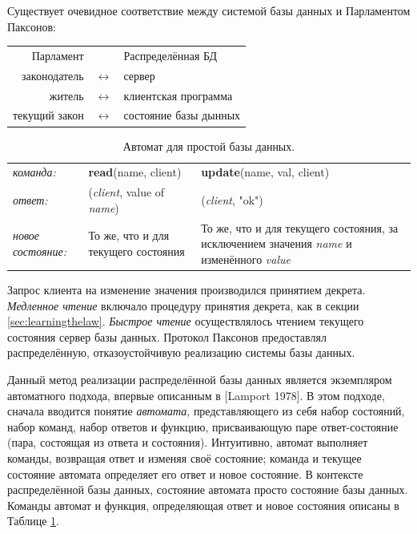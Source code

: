 \documentclass[12pt, a4paper]{article} %
\begin{document}
Существует очевидное соответствие между системой базы данных и Парламентом Паксонов:
\begin{table}[h]
\begin{center}
\begin{tabular}{rcl}
    Парламент&&Распределённая БД\\
    законодатель&$\leftrightarrow$&сервер\\
    житель&$\leftrightarrow$&клиентская программа\\
    текущий закон&$\leftrightarrow$&состояние базы дынных\\
\end{tabular}
\end{center}
\end{table}


\begin{table}[h]
\begin{tabular}{lp{4cm}p{3.6cm}}
    \textit{команда:}&\textbf{read}(name, client)&\textbf{update}(name, val, client)\\
    \textit{ответ:}&(\textit{client}, value of \textit{name})&(\textit{client}, "ok")\\
    \textit{новое состояние:}&То же, что и для текущего состояния&То же, что и для текущего состояния, за исключением значения \textit{name} и изменённого \textit{value}\\
\end{tabular}
\caption{Автомат для простой базы данных.}
\label{table:1}
\end{table}
Запрос клиента на изменение значения производился принятием декрета. \textit{Медленное чтение} включало процедуру принятия декрета, как в секции \ref{sec:learningthelaw}. \textit{Быстрое чтение} осуществлялось чтением текущего состояния сервер базы данных. Протокол Паксонов предоставлял распределённую, отказоустойчивую реализацию системы базы данных.

Данный метод реализации распределённой базы данных является экземпляром автоматного подхода, впервые описанным в [Lamport 1978]. В этом подходе, сначала вводится понятие \textit{автомата}, представляющего из себя набор состояний, набор команд, набор ответов и функцию, присваивающую паре ответ-состояние (пара, состоящая из ответа и состояния). Интуитивно, автомат выполняет команды, возвращая ответ и изменяя своё состояние; команда и текущее состояние автомата определяет его ответ и новое состояние. В контексте распределённой базы данных, состояние автомата просто состояние базы данных. Команды автомат и функция, определяющая ответ и новое состояния описаны в Таблице \ref{table:1}.
\end{document}
